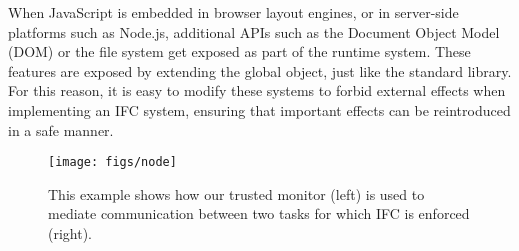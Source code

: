 \documentclass{llncs}
\begin{document}
When JavaScript is embedded in browser layout engines,
or in server-side platforms such as Node.js,
additional APIs such as the Document Object Model (DOM) or the file
system get exposed as part of the runtime system.
These features are exposed by extending the global object, just like
the standard library.  For this reason, it is easy to modify
these systems to forbid external effects when implementing
an IFC system, ensuring that important effects can be reintroduced in a safe manner.



\begin{figure}[t]
\centerline{\texttt{[image: figs/node]}}
\caption{\label{fig:node}
This example shows how our trusted monitor (left) is used to mediate
communication between two tasks for which IFC is enforced (right).}
\end{figure}
\end{document}
